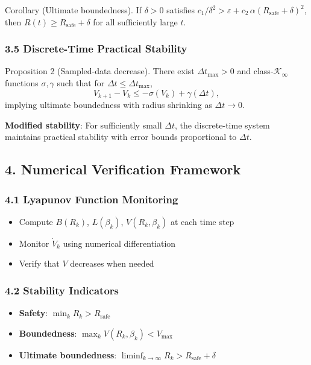 \documentclass[11pt,a4paper]{article}
\numberwithin{equation}{section}
\begin{document}
Corollary (Ultimate boundedness). If $\delta>0$ satisfies $c_1/\delta^2 > \varepsilon + c_2\,\alpha(R_{\text{safe}}+\delta)^2$, then $R(t)\ge R_{\text{safe}}+\delta$ for all sufficiently large $t$.

\subsubsection{3.5 Discrete-Time Practical Stability}

Proposition 2 (Sampled-data decrease). There exist $\Delta t_{\max}>0$ and class-$\mathcal{K}_\infty$ functions $\sigma,\gamma$ such that for $\Delta t\le \Delta t_{\max}$,
\[
V_{k+1}-V_k \le -\sigma(V_k)+\gamma(\Delta t),
\]
implying ultimate boundedness with radius shrinking as $\Delta t\to 0$.

\textbf{Modified stability}: For sufficiently small $\Delta t$, the discrete-time system maintains practical stability with error bounds proportional to $\Delta t$.

\subsection{4. Numerical Verification Framework}

\subsubsection{4.1 Lyapunov Function Monitoring}
\begin{itemize}
\item Compute $B(R_k)$, $L(\beta_k)$, $V(R_k, \beta_k)$ at each time step
\item Monitor $\dot{V}_k$ using numerical differentiation
\item Verify that $V$ decreases when needed
\end{itemize}

\subsubsection{4.2 Stability Indicators}
\begin{itemize}
\item \textbf{Safety}: $\min_k R_k > R_{\text{safe}}$
\item \textbf{Boundedness}: $\max_k V(R_k, \beta_k) < V_{\max}$
\item \textbf{Ultimate boundedness}: $\liminf_{k \to \infty} R_k > R_{\text{safe}} + \delta$
\end{itemize}
\end{document}

